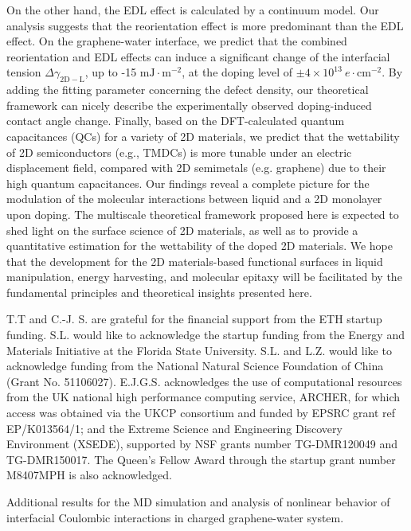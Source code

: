 \documentclass[journal=ancac3,manuscript=article,email=true,hyperref=true,keywords=true]{achemso}
\begin{document}
On the other hand, the EDL effect is calculated by a continuum model. Our
analysis suggests that the reorientation effect is more predominant
than the EDL effect. On the graphene-water interface, we predict that
the combined reorientation and EDL effects can induce a significant
change of the interfacial tension \(\Delta
\gamma_{\mathrm{2D-L}}\), up to -15 \(\mathrm{mJ}\cdot
\mathrm{m}^{-2}\), at the doping level of \(\pm 4 \times 10^{13}\ e\cdot
\mathrm{cm}^{-2}\). By adding the fitting parameter concerning the
defect density, our theoretical framework can nicely describe the
experimentally observed doping-induced contact angle change. Finally,
based on the DFT-calculated quantum capacitances (QCs) for a variety
of 2D materials, we predict that the wettability of 2D semiconductors
(e.g., TMDCs) is more tunable under an electric displacement field,
compared with 2D semimetals (e.g. graphene) due to their high quantum
capacitances. Our findings reveal a complete picture for the
modulation of the molecular interactions between liquid and a 2D monolayer upon
doping. The multiscale theoretical
framework proposed here is expected to shed
light on the surface science of 2D materials, 
as well as to provide a quantitative estimation for the wettability
of the doped 2D materials. We hope that the development for the 2D
materials-based functional surfaces in liquid manipulation, energy
harvesting, and molecular epitaxy will be facilitated by the
fundamental principles and theoretical insights presented here.

\begin{acknowledgement}
  T.T and C.-J. S. are grateful for the financial support from the ETH
  startup funding.  S.L. would like to acknowledge the startup funding
  from the Energy and Materials Initiative at the Florida State
  University. S.L. and L.Z. would like to acknowledge funding from the
  National Natural Science Foundation of China (Grant
  No. 51106027). E.J.G.S. acknowledges the use of computational
  resources from the UK national high performance computing service,
  ARCHER, for which access was obtained via the UKCP consortium and
  funded by EPSRC grant ref EP/K013564/1; and the Extreme Science and
  Engineering Discovery Environment (XSEDE), supported by NSF grants
  number TG-DMR120049 and TG-DMR150017. The Queen’s Fellow Award
  through the startup grant number M8407MPH is also acknowledged.
\end{acknowledgement}

\begin{suppinfo}
Additional results for the MD simulation and analysis of nonlinear
behavior of interfacial Coulombic interactions in charged
graphene-water system.
\end{suppinfo}
\end{document}
